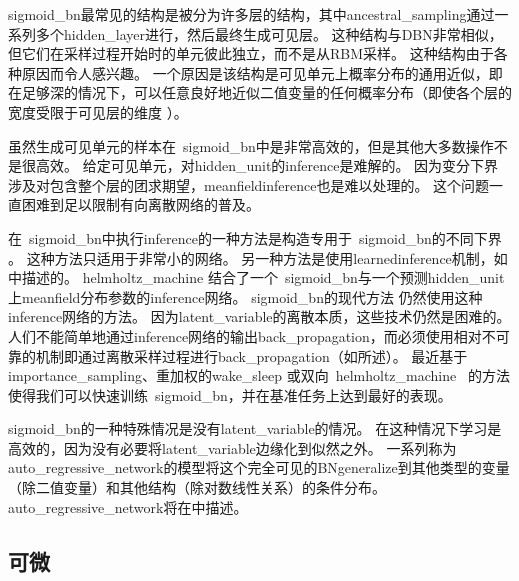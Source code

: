 \gls{sigmoid_bn}最常见的结构是被分为许多层的结构，其中\gls{ancestral_sampling}通过一系列多个\gls{hidden_layer}进行，然后最终生成可见层。
这种结构与\gls{DBN}非常相似，但它们在采样过程开始时的单元彼此独立，而不是从\gls{RBM}采样。
这种结构由于各种原因而令人感兴趣。
一个原因是该结构是可见单元上概率分布的通用近似，即在足够深的情况下，可以任意良好地近似二值变量的任何概率分布（即使各个层的宽度受限于可见层的维度 ）\citep{Sutskever+Hinton-2008}。


虽然生成可见单元的样本在~\gls{sigmoid_bn}中是非常高效的，但是其他大多数操作不是很高效。
给定可见单元，对\gls{hidden_unit}的\gls{inference}是难解的。
因为变分下界涉及对包含整个层的团求期望，\gls{meanfield}\gls{inference}也是难以处理的。
这个问题一直困难到足以限制有向离散网络的普及。


在~\gls{sigmoid_bn}中执行\gls{inference}的一种方法是构造专用于~\gls{sigmoid_bn}的不同下界 \citep{Saul+96}。
这种方法只适用于非常小的网络。
另一种方法是使用\gls{learned}\gls{inference}机制，如中描述的。
\gls{helmholtz_machine} \citep{Dayan-et-al-1995,dayan1996varieties} 结合了一个~\gls{sigmoid_bn}与一个预测\gls{hidden_unit}上\gls{meanfield}分布参数的\gls{inference}网络。
\gls{sigmoid_bn}的现代方法\citep{Gregor-et-al-ICML2014,Mnih+Gregor-ICML2014} 仍然使用这种\gls{inference}网络的方法。
因为\gls{latent_variable}的离散本质，这些技术仍然是困难的。
人们不能简单地通过\gls{inference}网络的输出\gls{back_propagation}，而必须使用相对不可靠的机制即通过离散采样过程进行\gls{back_propagation}（如所述）。
最近基于\gls{importance_sampling}、重加权的\gls{wake_sleep}\citep{Bornschein+Bengio-ICLR2015-small} 或双向~\gls{helmholtz_machine}~\citep{Bornschein-et-al-arxiv2015-small} 的方法使得我们可以快速训练~\gls{sigmoid_bn}，并在基准任务上达到最好的表现。

\gls{sigmoid_bn}的一种特殊情况是没有\gls{latent_variable}的情况。
在这种情况下学习是高效的，因为没有必要将\gls{latent_variable}边缘化到似然之外。
一系列称为\gls{auto_regressive_network}的模型将这个完全可见的\gls{BN}\gls{generalize}到其他类型的变量（除二值变量）和其他结构（除对数线性关系）的条件分布。
\gls{auto_regressive_network}将在中描述。


\subsection{可微}
\label{sec:differentiable_generator_networks}

